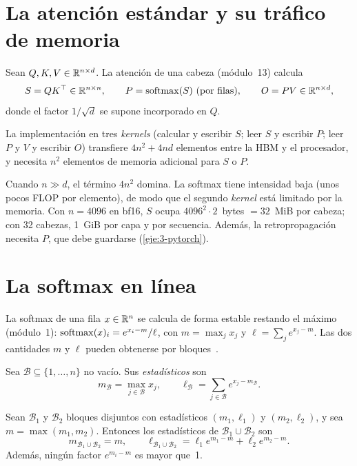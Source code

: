 \section{La atención estándar y su tráfico de memoria}

Sean $Q,K,V\in\mathbb{R}^{n\times d}$. La atención de una cabeza (módulo~13) calcula
\[
S=QK\T\in\R^{n\times n},\qquad P=\softmax(S)\ \text{(por filas)},\qquad O=PV\in\R^{n\times d},
\]
donde el factor $1/\sqrt{d}$ se supone incorporado en $Q$.

\begin{proposicion}\label{prop:atencion-estandar}
La implementación en tres \emph{kernels} (calcular y escribir $S$; leer $S$ y escribir $P$; leer $P$ y $V$ y escribir $O$) transfiere $4n^{2}+4nd$ elementos entre la HBM y el procesador, y necesita $n^{2}$ elementos de memoria adicional para $S$ o $P$.
\end{proposicion}

Cuando $n\gg d$, el término $4n^{2}$ domina. La softmax tiene intensidad baja (unos pocos FLOP por elemento), de modo que el segundo \emph{kernel} está limitado por la memoria. Con $n=4096$ en bf16, $S$ ocupa $4096^{2}\cdot 2$~bytes $=32$~MiB por cabeza; con 32 cabezas, 1~GiB por capa y por secuencia. Además, la retropropagación necesita $P$, que debe guardarse (\cref{eje:3-pytorch}).

\section{La softmax en línea}

La softmax de una fila $x\in\mathbb{R}^{n}$ se calcula de forma estable restando el máximo (módulo~1): $\operatorname{softmax}(x)_i=e^{x_i-m}/\ell$, con $m=\max_j x_j$ y $\ell=\sum_j e^{x_j-m}$. Las dos cantidades $m$ y $\ell$ pueden obtenerse por bloques~\cite{milakov}.

\begin{definicion}
Sea $\mathcal{B}\subseteq\{1,\dots,n\}$ no vacío. Sus \emph{estadísticos} son
\[
m_{\mathcal{B}}=\max_{j\in\mathcal{B}}x_j,\qquad \ell_{\mathcal{B}}=\sum_{j\in\mathcal{B}}e^{x_j-m_{\mathcal{B}}}.
\]
\end{definicion}

\begin{lema}\label{lem:combinacion}
Sean $\mathcal{B}_1$ y $\mathcal{B}_2$ bloques disjuntos con estadísticos $(m_1,\ell_1)$ y $(m_2,\ell_2)$, y sea $m=\max(m_1,m_2)$. Entonces los estadísticos de $\mathcal{B}_1\cup\mathcal{B}_2$ son
\[
m_{\mathcal{B}_1\cup\mathcal{B}_2}=m,\qquad \ell_{\mathcal{B}_1\cup\mathcal{B}_2}=\ell_1e^{m_1-m}+\ell_2e^{m_2-m}.
\]
Además, ningún factor $e^{m_i-m}$ es mayor que~1.
\end{lema}

